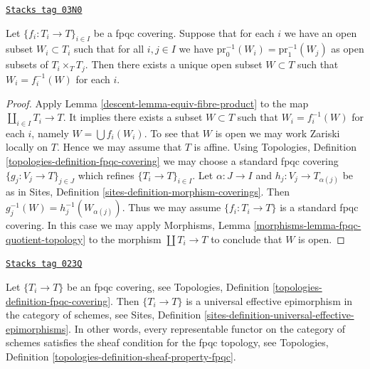 \begin{lemma}
\label{descent-lemma-open-fpqc-covering}
\href{https://stacks.math.columbia.edu/tag/03N0}{\texttt{Stacks tag 03N0}}

Let $\{f_i : T_i \to T\}_{i \in I}$ be a fpqc covering.
Suppose that for each $i$ we have an open subset $W_i \subset T_i$
such that for all $i, j \in I$ we have
$\text{pr}_0^{-1}(W_i) = \text{pr}_1^{-1}(W_j)$ as open
subsets of $T_i \times_T T_j$. Then there exists a unique open subset
$W \subset T$ such that $W_i = f_i^{-1}(W)$ for each $i$.
\end{lemma}

\begin{proof}

Apply
Lemma \ref{descent-lemma-equiv-fibre-product}
to the map $\coprod_{i \in I} T_i \to T$.
It implies there exists a subset $W \subset T$ such that
$W_i = f_i^{-1}(W)$ for each $i$, namely $W = \bigcup f_i(W_i)$.
To see that $W$ is open we may work Zariski locally on $T$.
Hence we may assume that $T$ is affine. Using Topologies, Definition
\ref{topologies-definition-fpqc-covering} we may choose
a standard fpqc covering $\{g_j : V_j \to T\}_{j \in J}$ which refines
$\{T_i \to T\}_{i \in I}$. Let $\alpha : J \to I$ and
$h_j : V_j \to T_{\alpha(j)}$ be as in
Sites, Definition \ref{sites-definition-morphism-coverings}.
Then $g_j^{-1}(W) = h_j^{-1}(W_{\alpha(j)})$.
Thus we may assume $\{f_i : T_i \to T\}$ is a standard fpqc covering.
In this case we may apply
Morphisms, Lemma \ref{morphisms-lemma-fpqc-quotient-topology}
to the morphism $\coprod T_i \to T$ to conclude that $W$ is open.
\end{proof}

\begin{lemma}
\label{descent-lemma-fpqc-universal-effective-epimorphisms}
\href{https://stacks.math.columbia.edu/tag/023Q}{\texttt{Stacks tag 023Q}}

Let $\{T_i \to T\}$ be an fpqc covering, see
Topologies, Definition \ref{topologies-definition-fpqc-covering}.
Then $\{T_i \to T\}$ is a universal effective epimorphism
in the category of schemes, see
Sites, Definition \ref{sites-definition-universal-effective-epimorphisms}.
In other words, every representable functor on the category of schemes
satisfies the sheaf condition for the fpqc topology, see
Topologies, Definition \ref{topologies-definition-sheaf-property-fpqc}.
\end{lemma}

